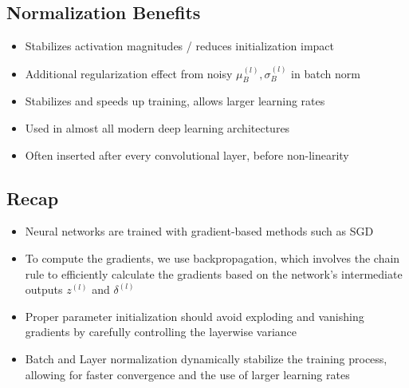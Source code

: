 \subsection*{Normalization Benefits}

\begin{itemize}
  \item Stabilizes activation magnitudes / reduces initialization impact
  \item Additional regularization effect from noisy $\mu_{B}^{(l)}, \sigma_{B}^{(l)}$ in batch norm
  \item Stabilizes and speeds up training, allows larger learning rates
  \item Used in almost all modern deep learning architectures
  \item Often inserted after every convolutional layer, before non-linearity
\end{itemize}

\subsection*{Recap}
\begin{itemize}
  \item Neural networks are trained with gradient-based methods such as SGD

  \item To compute the gradients, we use backpropagation, which involves the chain rule to efficiently calculate the gradients based on the network's intermediate outputs $z^{(l)}$ and $\delta^{(l)}$

  \item Proper parameter initialization should avoid exploding and vanishing gradients by carefully controlling the layerwise variance

  \item Batch and Layer normalization dynamically stabilize the training process, allowing for faster convergence and the use of larger learning rates

\end{itemize}